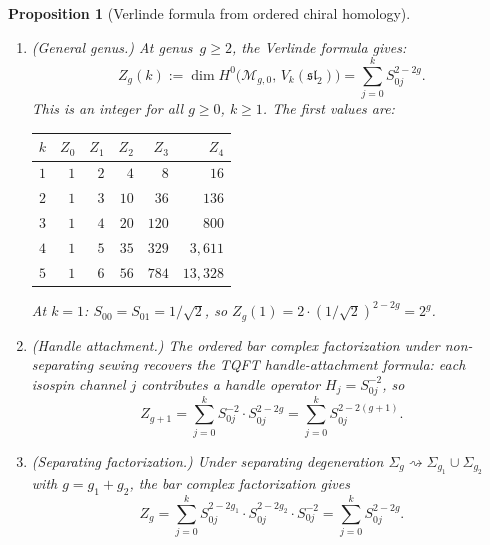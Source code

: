 \documentclass[11pt,reqno]{amsart}
\newtheorem{proposition}[theorem]{Proposition}
\theoremstyle{definition}
\theoremstyle{remark}
\newcommand{\cM}{\mathcal{M}}
\numberwithin{equation}{section}
\begin{document}
\begin{proposition}[Verlinde formula from ordered chiral
homology]
\begin{enumerate}[label=\textup{(\roman*)}]
\item \textup{(General genus.)}
  At genus~$g \geq 2$, the Verlinde formula gives:
  \begin{equation}\label{eq:verlinde-general}
    Z_g(k) := \dim H^0\!\bigl(\cM_{g,0},\,
    V_k(\mathfrak{sl}_2)\bigr)
    = \sum_{j=0}^{k} S_{0j}^{2-2g}.
  \end{equation}
  This is an integer for all $g \geq 0$, $k \geq 1$.
  The first values are:
  \begin{center}
  \renewcommand{\arraystretch}{1.3}
  \begin{tabular}{@{} c r r r r r @{}}
  \toprule
  $k$ & $Z_0$ & $Z_1$ & $Z_2$ & $Z_3$ & $Z_4$ \\
  \midrule
  $1$ & $1$ & $2$ & $4$ & $8$ & $16$ \\
  $2$ & $1$ & $3$ & $10$ & $36$ & $136$ \\
  $3$ & $1$ & $4$ & $20$ & $120$ & $800$ \\
  $4$ & $1$ & $5$ & $35$ & $329$ & $3{,}611$ \\
  $5$ & $1$ & $6$ & $56$ & $784$ & $13{,}328$ \\
  \bottomrule
  \end{tabular}
  \end{center}
  At $k = 1$: $S_{00} = S_{01} = 1/\sqrt{2}$, so
  $Z_g(1) = 2 \cdot (1/\sqrt{2})^{2-2g} = 2^g$.

\item \textup{(Handle attachment.)}
  The ordered bar complex factorization under non-separating
  sewing recovers the TQFT handle-attachment formula:
  each isospin channel $j$ contributes a handle operator
  $H_j = S_{0j}^{-2}$, so
  \begin{equation}\label{eq:handle-attachment}
    Z_{g+1}
    = \sum_{j=0}^{k} S_{0j}^{-2} \cdot S_{0j}^{2-2g}
    = \sum_{j=0}^{k} S_{0j}^{2-2(g+1)}.
  \end{equation}

\item \textup{(Separating factorization.)}
  Under separating degeneration $\Sigma_g \rightsquigarrow
  \Sigma_{g_1} \cup \Sigma_{g_2}$ with $g = g_1 + g_2$,
  the bar complex factorization gives
  \begin{equation}\label{eq:sep-factorization}
    Z_g
    = \sum_{j=0}^{k} S_{0j}^{2-2g_1} \cdot S_{0j}^{2-2g_2}
    \cdot S_{0j}^{-2}
    = \sum_{j=0}^{k} S_{0j}^{2-2g}.
  \end{equation}
\end{enumerate}
\end{proposition}
\end{document}
